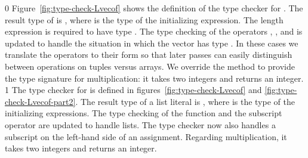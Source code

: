 \documentclass[7x10]{TimesAPriori_MIT}%
\def\racketEd{0}
\def\pythonEd{1}
\def\edition{1}
\newcommand{\pythonColor}[0]{}
\numberwithin{theorem}{chapter}
\numberwithin{definition}{chapter}
\numberwithin{equation}{chapter}
\begin{document}
{\if\edition\racketEd
%
Figure~\ref{fig:type-check-Lvecof} shows the definition of the type
checker for \LangArray{}. The result type of
 is , where  is the type
of the initializing expression.  The length expression is required to
have type . The type checking of the operators
, , and   is
updated to handle the situation in which the vector has type
. In these cases we translate the operators to their
 form so that later passes can easily distinguish
between operations on tuples versus arrays. We override the
 method to provide the type signature for
multiplication: it takes two integers and returns an integer.
\fi}
%
{\if\edition\pythonEd\pythonColor
%
The type checker for \LangArray{} is defined in
figures~\ref{fig:type-check-Lvecof} and
\ref{fig:type-check-Lvecof-part2}. The result type of a list literal
is , where  is the type of the initializing
expressions.  The type checking of the  function and the
subscript operator are updated to handle lists. The type checker now
also handles a subscript on the left-hand side of an assignment.
Regarding multiplication, it takes two integers and returns an
integer.
%
\fi}
\end{document}
